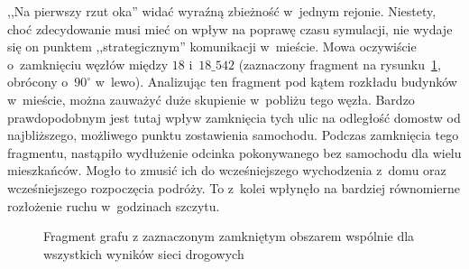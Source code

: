 \documentclass[twoside,12pt]{report}
\begin{document}
,,Na pierwszy rzut oka'' widać wyraźną zbieżność w~jednym rejonie. Niestety, choć zdecydowanie musi mieć on wpływ na poprawę czasu symulacji, nie wydaje się on punktem ,,strategicznym'' komunikacji w~mieście. Mowa oczywiście o~zamknięciu węzłów między $18$ i~$18\_542$ (zaznaczony fragment na rysunku~\ref{fig:frag_1}, obrócony o~$90^{\circ}$ w~lewo). Analizując ten fragment pod kątem rozkładu budynków w~mieście, można zauważyć duże skupienie w~pobliżu tego węzła. Bardzo prawdopodobnym jest tutaj wpływ zamknięcia tych ulic na odległość domostw od najbliższego, możliwego punktu zostawienia samochodu. Podczas zamknięcia tego fragmentu, nastąpiło wydłużenie odcinka pokonywanego bez samochodu dla wielu mieszkańców. Mogło to zmusić ich do wcześniejszego wychodzenia z~domu oraz wcześniejszego rozpoczęcia podróży. To z~kolei wpłynęło na bardziej równomierne rozłożenie ruchu w~godzinach szczytu.

\begin{figure}[htbp]
\centering
{}
\caption{Fragment grafu z zaznaczonym zamkniętym obszarem wspólnie dla wszystkich wyników sieci drogowych}
\label{fig:frag_1}
\end{figure}
\end{document}

